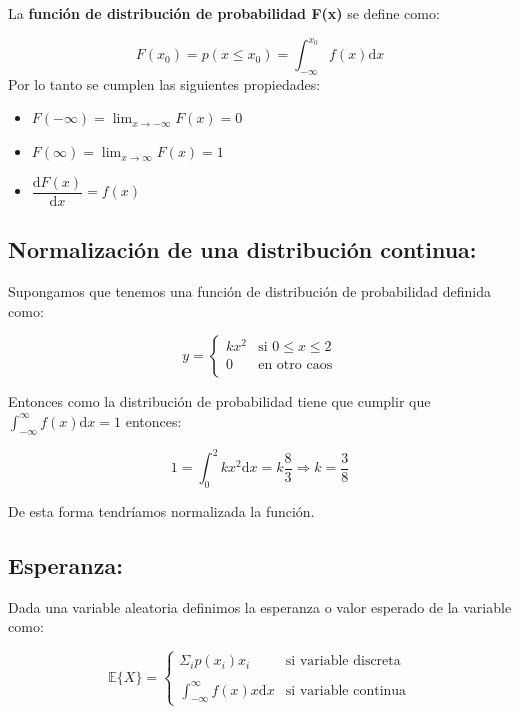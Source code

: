 \documentclass[12pt,a4paper]{book}
\newcommand{\D}{\mathrm{d}}
\newcommand{\E}{\mathbb{E}}
\begin{document}
La \textbf{función de distribución de probabilidad F(x)} se define como:

$$ F(x_0)  = p (x \leq x_0) = \int_{-\infty}^{x_0} f(x) \D x $$
Por lo tanto se cumplen las siguientes propiedades: 

\begin{itemize}

\item  $F(-\infty) = \lim_{x\rightarrow-\infty} F(x) = 0$

\item  $F(\infty) = \lim_{x\rightarrow\infty} F(x) = 1$ 

\item $\dfrac{\D F(x)}{\D x} = f(x)$

\end{itemize}

\subsection{Normalización de una distribución continua:}

Supongamos que tenemos una función de distribución de probabilidad definida como:

\begin{displaymath}
y = \left\{ \begin{array}{ll}
kx^2 & \textrm{si $0 \leq x \leq 2$}\\
0 & \textrm{en otro caos}\\
\end{array} \right.
\end{displaymath}


Entonces como la distribución de probabilidad tiene que cumplir que $\int_{-\infty}^{\infty} f(x) \D x = 1$ entonces:

$$ 1 = \int_0^2 k x^2 \D x = k \dfrac{8}{3} \Longrightarrow k = \frac{3}{8} $$

De esta forma tendríamos normalizada la función. 


\subsection{Esperanza:}

Dada una variable aleatoria definimos la esperanza o valor esperado de la variable como:

\begin{displaymath}
\E \{ X \} = \left\{ \begin{array}{ll}
\Sigma_i p(x_i) x_i & \textrm{si variable discreta}\\
 & \\
\int_{-\infty}^{\infty} f(x) x \D x & \textrm{si variable continua}
\end{array} \right.
\end{displaymath}
\end{document}
